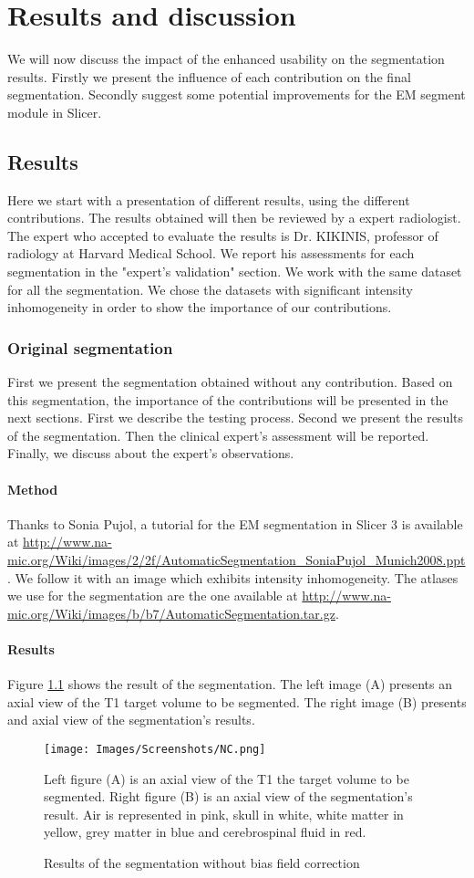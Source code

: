 \chapter{Results and discussion}\label{sec:results}
We will now discuss the impact of the enhanced usability on the segmentation results. Firstly we present the influence of each contribution on the final segmentation. Secondly suggest some potential improvements for the EM segment module in Slicer. 

%
\section{Results}
%
Here we start with a presentation of different results, using the different contributions. The results obtained will then be reviewed by a expert radiologist. The expert who accepted to evaluate the results is Dr. KIKINIS, professor of radiology at Harvard Medical School. We report his assessments for each segmentation in the "expert's validation" section. We work with the same dataset for all the segmentation. We chose the datasets with significant intensity inhomogeneity in order to show the importance of our contributions.
%
\subsection{Original segmentation}
First we present the segmentation obtained without any contribution. Based on this segmentation, the importance of the contributions will be presented in the next sections. First we describe the testing process. Second we present the results of the segmentation. Then the clinical expert's assessment will be reported. Finally, we discuss about the expert's observations.
\subsubsection{Method}
Thanks to Sonia Pujol, a tutorial for the EM segmentation in Slicer 3 is available at \url{http://www.na-mic.org/Wiki/images/2/2f/AutomaticSegmentation_SoniaPujol_Munich2008.ppt}. We follow it with an image which exhibits intensity inhomogeneity. The atlases we use for the segmentation are the one available at \url{http://www.na-mic.org/Wiki/images/b/b7/AutomaticSegmentation.tar.gz}.

\subsubsection{Results}
Figure \ref{fig:NC} shows the result of the segmentation. The left image (A) presents an axial view of the T1 target volume to be segmented. The right image (B) presents and axial view of the segmentation's results.
  \begin{figure}\centering
  \texttt{[image: Images/Screenshots/NC.png]}
  \caption{Results of the segmentation without bias field correction}{Left figure (A) is an axial view of the T1 the target volume to be segmented. Right figure (B) is an axial view of the segmentation's result. Air is represented in pink, skull in white, white matter in yellow, grey matter in blue and cerebrospinal fluid in red.}\label{fig:NC}
  \end{figure}
  
